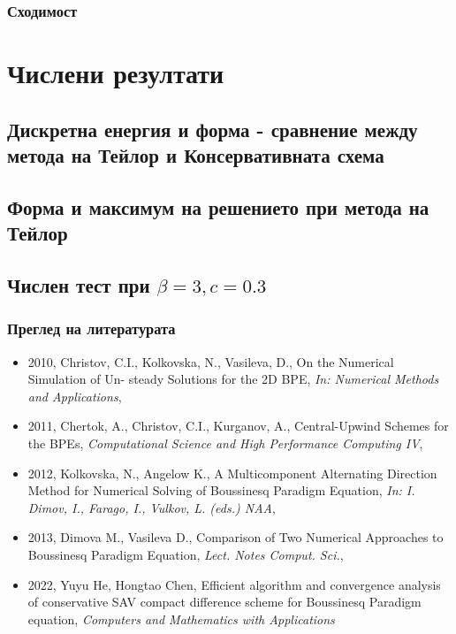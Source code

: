 \documentclass{beamer}
\begin{document}
\begin{frame}
\subsubsection{Сходимост}
\section{Числени резултати}
\subsection{Дискретна енергия и форма - сравнение между метода на Тейлор и Консервативната схема}
\subsection{Форма и максимум на решението при метода на Тейлор}
\subsection{Числен тест при $\beta = 3, c=0.3$}


\end{frame}

\begin{frame}
\frametitle{Преглед на литературата}

\begin{itemize}
  \item 2010, Christov, C.I., Kolkovska, N., Vasileva, D., On the Numerical Simulation of Un-
steady Solutions for the 2D BPE, {\it In: Numerical Methods and Applications},

  \item 2011, Chertok, A., Christov, C.I., Kurganov, A., Central-Upwind Schemes for the BPEs,
{\it Computational Science and High Performance Computing IV},

  \item 2012, Kolkovska, N., Angelow K., A Multicomponent Alternating Direction Method for Numerical Solving of Boussinesq Paradigm Equation, {\it In:  I. Dimov, I., Farago, I., Vulkov, L. (eds.) NAA},
  
  \item 2013, Dimova M., Vasileva D., Comparison of Two Numerical Approaches to Boussinesq Paradigm Equation,  {\it Lect. Notes Comput. Sci.}, 
  
  \item 2022, Yuyu He, Hongtao Chen, Efficient algorithm and convergence analysis of conservative SAV compact difference scheme for Boussinesq Paradigm equation, {\it Computers and Mathematics with Applications}
\end{itemize}

\end{frame}
\end{document}
